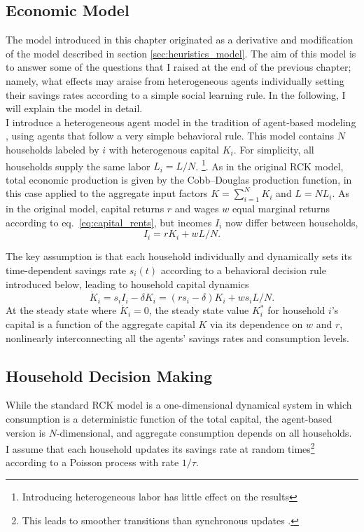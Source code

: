 \subsection{Economic Model}
The model introduced in this chapter originated as a derivative and modification of the model described in section \ref{sec:heuristics_model}. The aim of this model is to answer some of the questions that I raised at the end of the previous chapter; namely, what effects may araise from heterogeneous agents individually setting their savings rates according to a simple social learning rule. In the following, I will explain the model in detail.\\

I introduce a heterogeneous agent model in the tradition of agent-based modeling \citep{LeBaron1999,Berry2002,Epstein2006,Dosi2010, Dawid2014,Hommes2018,Simon2018},
using agents that follow a very simple behavioral rule.  
This model contains $N$ households labeled by $i$ with heterogenous capital $K_i$. For simplicity, all households supply the same labor $L_i = L/N$.  \footnote{Introducing heterogeneous labor has little effect on the results}.
As in the original RCK model, total economic production is given by the Cobb--Douglas production function, in this case applied to the aggregate input factors $K = \sum_{i=1}^N K_i$ and $L = N L_i$.
As in the original model, capital returns $r$ and wages $w$ equal marginal returns according to eq.~\eqref{eq:capital_rents},
but incomes $I_i$ now differ between households,
\begin{equation}
\label{eq:Ii}
	I_i = r K_i + w L/N.
\end{equation}

The key assumption is that each household individually and dynamically sets its time-dependent savings rate $s_i(t)$ according to a behavioral decision rule introduced below,
leading to household capital dynamics
\begin{equation}
	\dot{K}_i = s_i I_i - \delta K_i = (r s_i - \delta) K_i + w s_i L/N.
        \label{eq:rcka_kdot}
\end{equation}
At the steady state where $\dot{K}_i = 0$, the steady state value $K_i^*$ for household $i$'s capital is a function of the aggregate capital $K$ via its dependence on $w$ and $r$, 
nonlinearly interconnecting all the agents' savings rates and consumption levels.

\subsection{Household Decision Making}
While the standard RCK model is a one-dimensional dynamical system in which consumption is a deterministic function of the total capital, the agent-based version is $N$-dimensional, and aggregate consumption depends on all households.
I assume that each household updates its savings rate at random times\footnote{
%
This leads to smoother transitions than synchronous updates \citep{Vizzari2005, Fates2010}.
}
%
according to a Poisson process with rate $1/\tau$.

